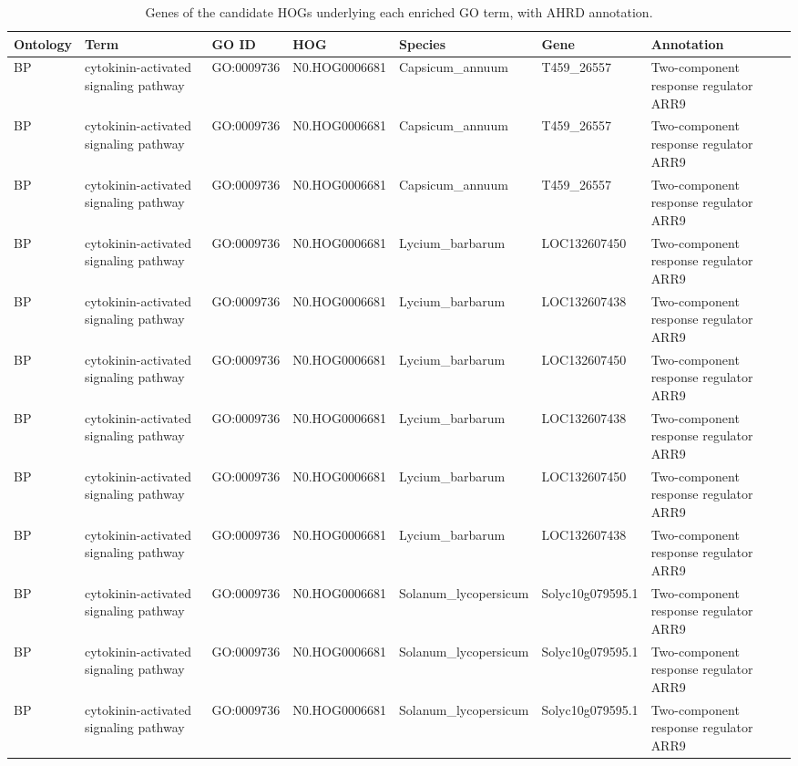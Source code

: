 \begin{table}

\caption{Genes of the candidate HOGs underlying each enriched GO term, with AHRD annotation.}
\centering
\begin{tabular}[t]{lllllll}
\toprule
Ontology & Term & GO ID & HOG & Species & Gene & Annotation\\
\midrule
BP & cytokinin-activated signaling pathway & GO:0009736 & N0.HOG0006681 & Capsicum\_annuum & T459\_26557 & Two-component response regulator ARR9\\
BP & cytokinin-activated signaling pathway & GO:0009736 & N0.HOG0006681 & Capsicum\_annuum & T459\_26557 & Two-component response regulator ARR9\\
BP & cytokinin-activated signaling pathway & GO:0009736 & N0.HOG0006681 & Capsicum\_annuum & T459\_26557 & Two-component response regulator ARR9\\
BP & cytokinin-activated signaling pathway & GO:0009736 & N0.HOG0006681 & Lycium\_barbarum & LOC132607450 & Two-component response regulator ARR9\\
BP & cytokinin-activated signaling pathway & GO:0009736 & N0.HOG0006681 & Lycium\_barbarum & LOC132607438 & Two-component response regulator ARR9\\
BP & cytokinin-activated signaling pathway & GO:0009736 & N0.HOG0006681 & Lycium\_barbarum & LOC132607450 & Two-component response regulator ARR9\\
BP & cytokinin-activated signaling pathway & GO:0009736 & N0.HOG0006681 & Lycium\_barbarum & LOC132607438 & Two-component response regulator ARR9\\
BP & cytokinin-activated signaling pathway & GO:0009736 & N0.HOG0006681 & Lycium\_barbarum & LOC132607450 & Two-component response regulator ARR9\\
BP & cytokinin-activated signaling pathway & GO:0009736 & N0.HOG0006681 & Lycium\_barbarum & LOC132607438 & Two-component response regulator ARR9\\
BP & cytokinin-activated signaling pathway & GO:0009736 & N0.HOG0006681 & Solanum\_lycopersicum & Solyc10g079595.1 & Two-component response regulator ARR9\\
BP & cytokinin-activated signaling pathway & GO:0009736 & N0.HOG0006681 & Solanum\_lycopersicum & Solyc10g079595.1 & Two-component response regulator ARR9\\
BP & cytokinin-activated signaling pathway & GO:0009736 & N0.HOG0006681 & Solanum\_lycopersicum & Solyc10g079595.1 & Two-component response regulator ARR9\\

\end{tabular}
\end{table}
